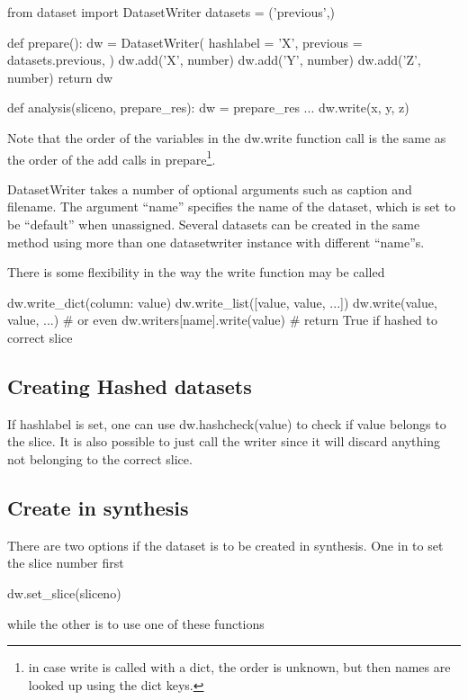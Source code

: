 \begin{python}
from dataset import DatasetWriter
datasets = ('previous',)

def prepare():
  dw = DatasetWriter(
    hashlabel = 'X',
    previous = datasets.previous,
  )
  dw.add('X', number)
  dw.add('Y', number)
  dw.add('Z', number)
  return dw

def analysis(sliceno, prepare_res):
  dw = prepare_res
  ...
  dw.write(x, y, z)
\end{python}
Note that the order of the variables in the dw.write function call is
the same as the order of the add calls in prepare\footnote{in case
  write is called with a dict, the order is unknown, but then names
  are looked up using the dict keys.}.

DatasetWriter takes a number of optional arguments such as caption and
filename.  The argument ``name'' specifies the name of the dataset,
which is set to be ``default'' when unassigned.  Several datasets can
be created in the same method using more than one datasetwriter
instance with different ``name''s.

There is some flexibility in the way the write function may be called

\begin{python}
  dw.write_dict({column: value})
  dw.write_list([value, value, ...])
  dw.write(value, value, ...)
  # or even
  dw.writers[name].write(value)  # return True if hashed to correct slice
\end{python}


\subsection{Creating Hashed datasets}
If hashlabel is set, one can use dw.hashcheck(value) to check if value
belongs to the slice.  It is also possible to just call the writer
since it will discard anything not belonging to the correct slice.



\subsection{Create in synthesis}

There are two options if the dataset is to be created in synthesis.
One in to set the slice number first

\begin{python}
  dw.set_slice(sliceno)
\end{python}
while the other is to use one of these functions

